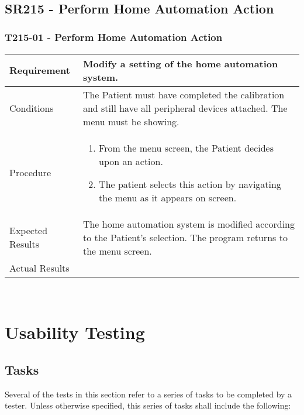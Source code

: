 \documentclass{article}
\begin{document}
\hfill \\

\subsection{SR215 - Perform Home Automation Action}
\subsubsection{T215-01 - Perform Home Automation Action}
\begin{tabular}{| l | p{12cm} |}
    \hline
	Requirement & Modify a setting of the home automation system. \\ \hline
	Conditions & The Patient must have completed the calibration and still
have all peripheral devices attached. The menu must be showing. \\ \hline
	Procedure & 
\begin{enumerate}
	\item From the menu screen, the Patient decides upon an action.
	\item The patient selects this action by navigating the menu as it appears
on screen.
\end{enumerate} \\ \hline
	Expected Results & The home automation system is modified according to the
Patient's selection. The program returns to the menu screen. \\ \hline
	Actual Results & \vspace{1cm} \\ \hline
\end{tabular}

\hfill \\

\newpage

\section{Usability Testing}
\subsection{Tasks}

Several of the tests in this section refer to a series of tasks to be
completed by a tester. Unless otherwise specified, this series of tasks shall
include the following:
\end{document}
